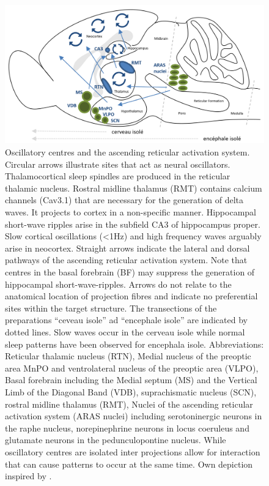 \begin{figure}[th]
\centering
\includegraphics[width=\textwidth,height=\textheight,keepaspectratio]{Figures/oscillatory_centres_and_the_ascending_reticular_activation_system}
\decoRule
\caption[Oscillatory centres and the ascending reticular activation system]{Oscillatory centres and the ascending reticular activation system.\\
Circular arrows illustrate sites that act as neural oscillators. Thalamocortical sleep spindles are produced in the reticular thalamic nucleus. Rostral midline thalamus (RMT) contains calcium channels (Cav3.1) that are necessary for the generation of delta waves. It projects to cortex in a non-specific manner. Hippocampal short-wave ripples arise in the subfield CA3 of hippocampus proper. Slow cortical oscillations (<1Hz) and high frequency waves arguably arise in neocortex. Straight arrows indicate the lateral and dorsal pathways of the ascending reticular activation system. Note that centres in the basal forebrain (BF) may suppress the generation of hippocampal short-wave-ripples. Arrows do not relate to the anatomical location of projection fibres and indicate no preferential sites within the target structure. The transections of the preparations “ceveau isole” ad “encephale isole” are indicated by dotted lines. Slow waves occur in the cerveau isole while normal sleep patterns have been observed for encephala isole. Abbreviations: Reticular thalamic nucleus (RTN), Medial nucleus of the preoptic area MnPO and ventrolateral nucleus of the preoptic area (VLPO),  Basal forebrain including the
Medial septum (MS) and the Vertical Limb of the Diagonal Band (VDB), suprachismatic nucleus (SCN), rostral midline thalamus (RMT), Nuclei of the ascending reticular activation system (ARAS nuclei) including serotoninergic neurons in the raphe nucleus, norepinephrine neurons in locus coeruleus and glutamate neurons in the pedunculopontine nucleus. While oscillatory centres are isolated inter projections allow for interaction that can cause patterns to occur at the same time. Own depiction inspired by \parencite[1099]{brown2012control}.}
\label{fig:oscillatory_centres_and_the_ascending_reticular_activation_system}
\end{figure}


